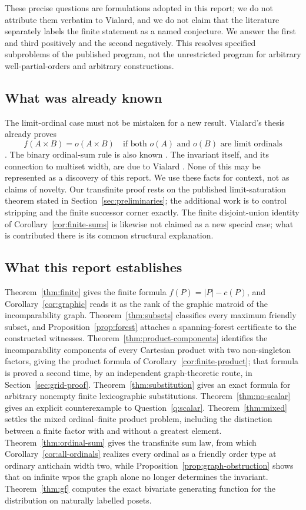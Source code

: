 \documentclass[11pt,letterpaper]{article}
\theoremstyle{definition}
\theoremstyle{remark}
\begin{document}
These precise questions are formulations adopted in this report; we do
not attribute them verbatim to Vialard, and we do not claim that the
literature separately labels the finite statement as a named conjecture.
We answer the first and third positively and the second negatively. This
resolves specified subproblems of the published program, not the
unrestricted program for arbitrary well-partial-orders and arbitrary
constructions.

\subsection{What was already known}
The limit-ordinal case must not be mistaken for a new result. Vialard's
thesis already proves
\[
 f(A\times B)=o(A\times B)
 \quad\text{if both $o(A)$ and $o(B)$ are limit ordinals}
\]
\cite[Theorem~5.4.8(3)]{VialardThesis}.
The binary ordinal-sum rule is also known
\cite[Proposition~4.1(1)]{Vialard2023}. The invariant itself, and its
connection to multiset width, are due to Vialard
\cite[Definition~3.3, Theorem~3.4]{Vialard2023}. None of this may be
represented as a discovery of this report. We use these facts for context,
not as claims of novelty. Our transfinite proof rests on the published
limit-saturation theorem stated in Section~\ref{sec:preliminaries}; the
additional work is to control stripping and the finite successor corner
exactly. The finite disjoint-union identity of
Corollary~\ref{cor:finite-sums} is likewise not claimed as a new special
case; what is contributed there is its common structural explanation.

\subsection{What this report establishes}
Theorem~\ref{thm:finite} gives the finite formula $f(P)=|P|-c(P)$, and
Corollary~\ref{cor:graphic} reads it as the rank of the graphic matroid of
the incomparability graph. Theorem~\ref{thm:subsets} classifies every
maximum friendly subset, and Proposition~\ref{prop:forest} attaches a
spanning-forest certificate to the constructed witnesses.
Theorem~\ref{thm:product-components} identifies the incomparability
components of every Cartesian product with two non-singleton factors, giving
the product formula of Corollary~\ref{cor:finite-product}; that formula is
proved a second time, by an independent graph-theoretic route, in
Section~\ref{sec:grid-proof}. Theorem~\ref{thm:substitution} gives an exact
formula for arbitrary nonempty finite lexicographic substitutions.
Theorem~\ref{thm:no-scalar} gives an explicit counterexample to
Question~\ref{q:scalar}. Theorem~\ref{thm:mixed} settles the mixed
ordinal--finite product problem, including the distinction between a
finite factor with and without a greatest element.
Theorem~\ref{thm:ordinal-sum} gives the transfinite sum law, from which
Corollary~\ref{cor:all-ordinals} realizes every ordinal as a friendly order
type at ordinary antichain width two, while
Proposition~\ref{prop:graph-obstruction} shows that on infinite wpos the
graph alone no longer determines the invariant.
Theorem~\ref{thm:gf} computes the exact bivariate generating function for
the distribution on naturally labelled posets.
\end{document}
